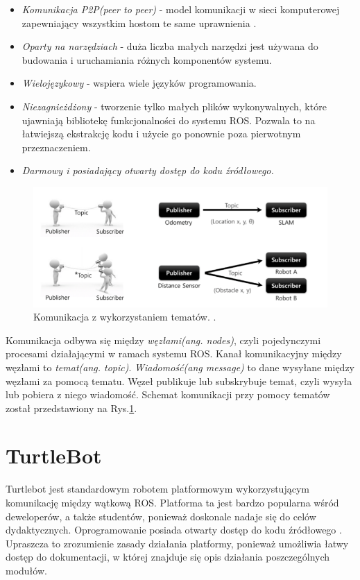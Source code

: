 \begin{itemize}
	\item 
	\textit{Komunikacja P2P(peer to peer)} - model komunikacji w sieci komputerowej zapewniający wszystkim hostom te same uprawnienia \cite{P2P}.
	\item
	\textit{Oparty na narzędziach} - duża liczba małych narzędzi jest używana do budowania i uruchamiania różnych komponentów systemu.
	\item 
	\textit{Wielojęzykowy} - wspiera wiele języków programowania.
	\item 
	\textit{Niezagnieżdżony} - tworzenie tylko małych plików wykonywalnych, które ujawniają bibliotekę funkcjonalności do systemu ROS. Pozwala to na łatwiejszą ekstrakcję kodu i użycie go ponownie poza pierwotnym przeznaczeniem.  
	\item 
	\textit{Darmowy i posiadający otwarty dostęp do kodu źródłowego.}
\end{itemize}

\begin{figure}[ht]
	\centering
	\includegraphics[scale=0.8]{topic.png}
	\caption{Komunikacja z wykorzystaniem tematów. \cite{ROS}.}
	\label{fig:topic}
\end{figure}

Komunikacja odbywa się między \textit{węzłami(ang. nodes)}, czyli pojedynczymi procesami działającymi w ramach systemu ROS. Kanał komunikacyjny między węzłami to \textit{temat(ang. topic)}. \textit{Wiadomość(ang message)} to dane wysyłane między węzłami za pomocą tematu. Węzeł publikuje lub subskrybuje temat, czyli wysyła lub pobiera z niego wiadomość. Schemat komunikacji przy pomocy tematów został przedstawiony na Rys.\ref{fig:topic}.




\section{TurtleBot}

Turtlebot jest standardowym robotem platformowym wykorzystującym komunikację między wątkową ROS. Platforma ta jest bardzo popularna wśród deweloperów, a także studentów, ponieważ doskonale nadaje się do celów dydaktycznych. Oprogramowanie posiada otwarty dostęp do kodu źródłowego \cite{turtlebot3}. Upraszcza to zrozumienie zasady działania platformy, ponieważ umożliwia łatwy dostęp do dokumentacji, w której znajduje się opis działania poszczególnych modułów. 

